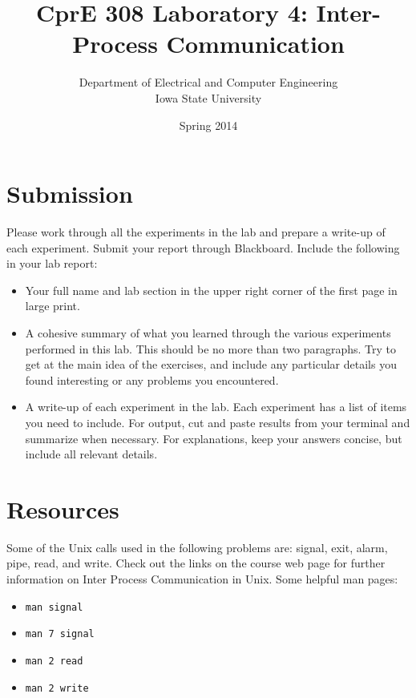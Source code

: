 \documentclass[letterpaper,10pt]{article}
\title{CprE 308 Laboratory 4: Inter-Process Communication}
\author{Department of Electrical and Computer Engineering \\ Iowa State University}
\date{Spring 2014}
\newcommand{\cmd}[1]{\texttt{#1}}
\begin{document}
\maketitle

\section{Submission}

Please work through all the experiments in the lab and prepare a write-up of each experiment.
Submit your report through Blackboard. Include the following in your lab report:
\begin{itemize}
 \item Your full name and lab section in the upper right corner of the first page in large print.
 \item A cohesive summary of what you learned through the various experiments performed in this
lab. This should be no more than two paragraphs. Try to get at the main idea of the
exercises, and include any particular details you found interesting or any problems you
encountered.
 \item A write-up of each experiment in the lab. Each experiment has a list of items you need to
include. For output, cut and paste results from your terminal and summarize when
necessary. For explanations, keep your answers concise, but include all relevant details.
\end{itemize}


\section{Resources}

Some of the Unix calls used in the following problems are: signal, exit, alarm, pipe, read, and
write. Check out the links on the course web page for further information on Inter Process
Communication in Unix. Some helpful man pages:

 \begin{itemize}
  \item \verb+man signal+
  \item \verb+man 7 signal+
  \item \verb+man 2 read+
  \item \verb+man 2 write+
 \end{itemize}
\end{document}
